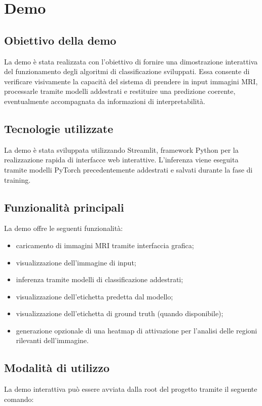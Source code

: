 \section{Demo}
\subsection{Obiettivo della demo}
La demo è stata realizzata con l’obiettivo di fornire una dimostrazione interattiva del funzionamento degli algoritmi di classificazione sviluppati.
Essa consente di verificare visivamente la capacità del sistema di prendere in input immagini MRI, processarle tramite modelli addestrati e restituire una predizione coerente, eventualmente accompagnata da informazioni di interpretabilità.

\subsection{Tecnologie utilizzate}
La demo è stata sviluppata utilizzando Streamlit, framework Python per la realizzazione rapida di interfacce web interattive.
L’inferenza viene eseguita tramite modelli PyTorch precedentemente addestrati e salvati durante la fase di training.

\subsection{Funzionalità principali}
La demo offre le seguenti funzionalità:
\begin{itemize}
\item caricamento di immagini MRI tramite interfaccia grafica;
\item visualizzazione dell’immagine di input;
\item inferenza tramite modelli di classificazione addestrati;
\item visualizzazione dell’etichetta predetta dal modello;
\item visualizzazione dell’etichetta di ground truth (quando disponibile);
\item generazione opzionale di una heatmap di attivazione per l’analisi delle regioni rilevanti dell’immagine.
\end{itemize}

\subsection{Modalità di utilizzo}

La demo interattiva può essere avviata dalla root del progetto tramite il seguente comando:

